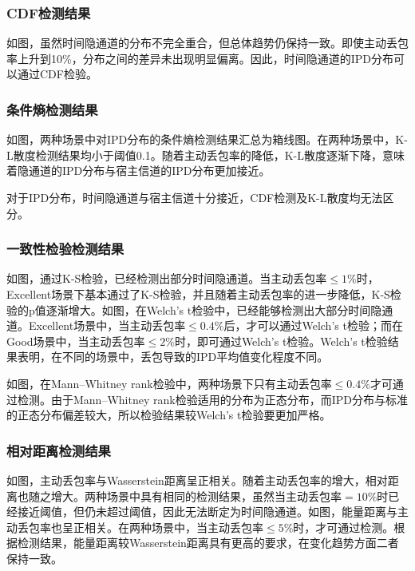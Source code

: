 \subsubsection{CDF检测结果}
\label{chap:analyze:result:ipd:cdf}

如图，虽然时间隐通道的分布不完全重合，但总体趋势仍保持一致。即使主动丢包率上升到10\%，分布之间的差异未出现明显偏离。因此，时间隐通道的IPD分布可以通过CDF检验。

\subsubsection{条件熵检测结果}
\label{chap:analyze:result:ipd:kld}

如图，两种场景中对IPD分布的条件熵检测结果汇总为箱线图。在两种场景中，K-L散度检测结果均小于阈值0.1。随着主动丢包率的降低，K-L散度逐渐下降，意味着隐通道的IPD分布与宿主信道的IPD分布更加接近。

对于IPD分布，时间隐通道与宿主信道十分接近，CDF检测及K-L散度均无法区分。

\subsubsection{一致性检验检测结果}
\label{chap:analyze:result:ipd:statistical}

如图，通过K-S检验，已经检测出部分时间隐通道。当主动丢包率$\le 1\%$时，Excellent场景下基本通过了K-S检验，并且随着主动丢包率的进一步降低，K-S检验的p值逐渐增大。如图，在Welch's t检验中，已经能够检测出大部分时间隐通道。Excellent场景中，当主动丢包率$\le 0.4\%$后，才可以通过Welch's t检验；而在Good场景中，当主动丢包率$\le 2\%$时，即可通过Welch's t检验。Welch's t检验结果表明，在不同的场景中，丢包导致的IPD平均值变化程度不同。

如图，在Mann–Whitney rank检验中，两种场景下只有主动丢包率$\le 0.4\%$才可通过检测。由于Mann–Whitney rank检验适用的分布为正态分布，而IPD分布与标准的正态分布偏差较大，所以检验结果较Welch's t检验要更加严格。

\subsubsection{相对距离检测结果}
\label{chap:analyze:result:ipd:distance}

如图，主动丢包率与Wasserstein距离呈正相关。随着主动丢包率的增大，相对距离也随之增大。两种场景中具有相同的检测结果，虽然当主动丢包率$=10\%$时已经接近阈值，但仍未超过阈值，因此无法断定为时间隐通道。如图，能量距离与主动丢包率也呈正相关。在两种场景中，当主动丢包率$\le 5\%$时，才可通过检测。根据检测结果，能量距离较Wasserstein距离具有更高的要求，在变化趋势方面二者保持一致。

